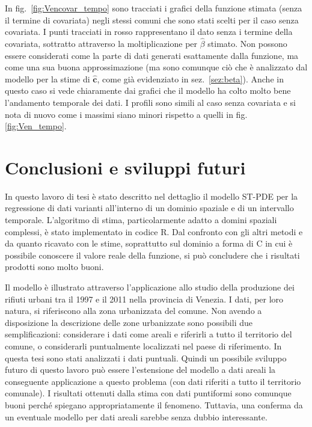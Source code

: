 \documentclass[a4paper,11pt,twoside,openright]{book}							%
\begin{document}
In fig.~\ref{fig:Vencovar_tempo} sono tracciati i grafici della funzione stimata (senza il termine di covariata) negli stessi comuni che sono stati scelti per il caso senza covariata. I punti tracciati in rosso rappresentano il dato senza i termine della covariata, sottratto attraverso la moltiplicazione per $\hat{\beta}$ stimato. Non possono essere considerati come la parte di dati generati esattamente dalla funzione, ma come una sua buona approssimazione (ma sono comunque ciò che è analizzato dal modello per la stime di $\hat{\bm{c}}$, come già evidenziato in sez.~\ref{sez:beta}). Anche in questo caso si vede chiaramente dai grafici che il modello ha colto molto bene l'andamento temporale dei dati. I profili sono simili al caso senza covariata e si nota di nuovo come i massimi siano minori rispetto a quelli in fig.\ref{fig:Ven_tempo}.

\newpage
\thispagestyle{empty}

\chapter{Conclusioni e sviluppi futuri}
\label{cap:conclusione}

In questo lavoro di tesi è stato descritto nel dettaglio il modello ST-PDE per la regressione di dati varianti all'interno di un dominio spaziale e di un intervallo temporale. L'algoritmo di stima, particolarmente adatto a domini spaziali complessi, è stato implementato in codice R. Dal confronto con gli altri metodi e da quanto ricavato con le stime, soprattutto sul dominio a forma di C in cui è possibile conoscere il valore reale della funzione, si può concludere che i risultati prodotti sono molto buoni.

Il modello è illustrato attraverso l'applicazione allo studio della produzione dei rifiuti urbani tra il 1997 e il 2011 nella provincia di Venezia. I dati, per loro natura, si riferiscono alla zona urbanizzata del comune. Non avendo a disposizione la descrizione delle zone urbanizzate sono possibili due semplificazioni: considerare i dati come areali e riferirli a tutto il territorio del comune, o considerarli puntualmente localizzati nel paese di riferimento. In questa tesi sono stati analizzati i dati puntuali. Quindi un possibile sviluppo futuro di questo lavoro può essere l'estensione del modello a dati areali la conseguente applicazione a questo problema (con dati riferiti a tutto il territorio comunale). I risultati ottenuti dalla stima con dati puntiformi sono comunque buoni perché spiegano appropriatamente il fenomeno. Tuttavia, una conferma da un eventuale modello per dati areali sarebbe senza dubbio interessante.
\end{document}
